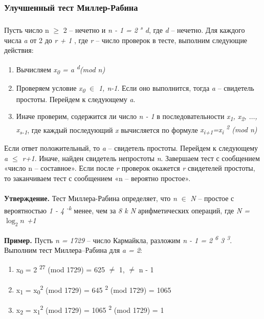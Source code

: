 \subsubsection{Улучшенный тест Миллер-Рабина}

\paragraph{} Пусть число n {$\ge$} 2 – нечетно и \textit{n - 1 = 2\textsuperscript{ s} d}, где \textit{d} – нечетно. Для каждого числа \textit{a}
от 2 до \textit{r + 1} , где \textit{r} – число проверок в  тесте, выполним следующие действия:

  \begin{enumerate}
   \item Вычисляем \textit{x\textsubscript{0} = a\textsuperscript{ d}(mod n)}
   \item Проверяем условие \textit{x\textsubscript{0}} {$\in$} \textit{{1, n-1}}. Если оно выполнится, тогда \textit{a} – свидетель 
простоты. Перейдем к следующему \textit{a}.
   \item Иначе проверим, содержится ли число \textit{n - 1} в последовательности 
\textit{{x\textsubscript{1}, x\textsubscript{2}, {$\dots$}, x\textsubscript{s-1}}}, где каждый последующий \textit{x} 
вычисляется по формуле \textit{x\textsubscript{i+1}=x\textsubscript{i}\textsuperscript{ 2} (mod n)}
  \end{enumerate}
  
  Если ответ положительный, то \textit{a} – свидетель простоты. Перейдем к следующему \textit{a {$\leq$} r+1}. Иначе, найден свидетель 
непростоты \textit{n}. Завершаем тест с сообщением «число n – составное». Если после \textit{r} проверок окажется \textit{r} свидетелей
простоты, то заканчиваем тест с сообщением «n – вероятно простое».

\paragraph{} \textbf{Утверждение.} Тест Миллера-Рабина определяет, что \textit{n} {$\in$} \textit{N} – простое с вероятностью
\textit{1 - 4\textsuperscript{ -k}} менее, чем за \textit{8 k N} арифметических операций, где \textit{N = {$\log_{2}{n}$} +1 }

  \textbf{Пример.} Пусть \textit{n = 1729} – число Кармайкла, разложим \textit{n - 1 = 2\textsuperscript{ 6} 3\textsuperscript{ 3}}. 
Выполним тест Миллера–Рабина для \textit{a = 2}:
  
  \begin{enumerate}
   \item x\textsubscript{0} = 2\textsuperscript{ 27} (mod 1729) = 625 {$\ne$} 1, {$\ne$} n - 1
   \item x\textsubscript{1} = x\textsubscript{0}\textsuperscript{2} (mod 1729) = 645\textsuperscript{ 2} (mod 1729) = 1065
   \item x\textsubscript{2} = x\textsubscript{1}\textsuperscript{2} (mod 1729) = 1065\textsuperscript{ 2} (mod 1729) = 1
  \end{enumerate}
  
